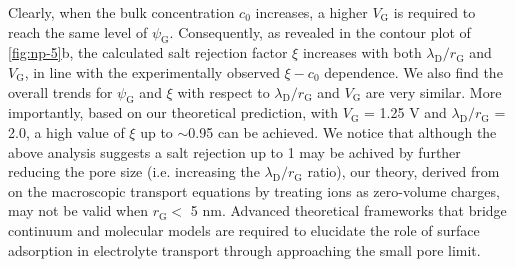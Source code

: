 %
Clearly, when the bulk concentration $c_{0}$ increases, a higher
$V_{\mathrm{G}}$ is required to reach the same level of
$\psi_{\mathrm{G}}$. Consequently, as revealed in the contour plot of
\autoref{fig:np-5}b, the calculated salt rejection factor $\xi$
increases with both $\lambda_{\mathrm{D}} / r_{\mathrm{G}}$ and
$V_{\mathrm{G}}$, in line with the experimentally observed
$\xi - c_{0}$ dependence. We also find the overall trends for
$\psi_{\mathrm{G}}$ and $\xi$ with respect to
$\lambda_{\mathrm{D}}/r_{\mathrm{G}}$ and $V_{\mathrm{G}}$ are very
similar. More importantly, based on our theoretical prediction, with
$V_{\mathrm{G}}$ = 1.25 V and $\lambda_{\mathrm{D}} / r_{\mathrm{G}}$
= { 2.0}, a high value of $\xi$ up to $\sim$0.95 can be achieved.  We
notice that although the above analysis suggests a salt rejection up
to 1 may be achived by further reducing the pore size (i.e. increasing
the $\lambda_{\mathrm{D}}/r_{\mathrm{G}}$ ratio), our theory, derived
from on the macroscopic transport equations by treating ions as
zero-volume charges, may not be valid when $r_{\mathrm{G}}<$ 5
nm\autocite{Jain_2015_subcontin_ion}.  Advanced theoretical frameworks
that bridge continuum and molecular models are required to elucidate
the role of surface adsorption in electrolyte transport through
approaching the small pore limit.



